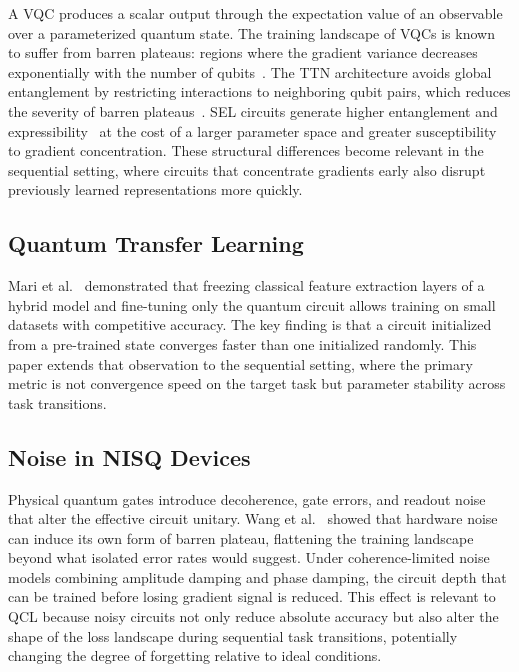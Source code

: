 \documentclass[10pt,conference]{IEEEtran}
\begin{document}
A VQC produces a scalar output through the expectation value of an
observable over a parameterized quantum state. The training landscape
of VQCs is known to suffer from barren plateaus: regions where the
gradient variance decreases exponentially with the number of
qubits~\cite{mcclean2018barren,cerezo2021cost}. The TTN architecture
avoids global entanglement by restricting interactions to neighboring
qubit pairs, which reduces the severity of barren
plateaus~\cite{pesah2021absence}. SEL circuits generate higher
entanglement and expressibility~\cite{sim2019expressibility} at the
cost of a larger parameter space and greater susceptibility to gradient
concentration. These structural differences become relevant in the
sequential setting, where circuits that concentrate gradients early
also disrupt previously learned representations more quickly.

\subsection{Quantum Transfer Learning}

Mari et al.~\cite{mari2020transfer} demonstrated that freezing
classical feature extraction layers of a hybrid model and fine-tuning
only the quantum circuit allows training on small datasets with
competitive accuracy. The key finding is that a circuit initialized
from a pre-trained state converges faster than one initialized randomly.
This paper extends that observation to the sequential setting, where
the primary metric is not convergence speed on the target task but
parameter stability across task transitions.

\subsection{Noise in NISQ Devices}

Physical quantum gates introduce decoherence, gate errors, and readout
noise that alter the effective circuit unitary. Wang et
al.~\cite{wang2024quantum} showed that hardware noise can induce its
own form of barren plateau, flattening the training landscape beyond
what isolated error rates would suggest. Under coherence-limited noise
models combining amplitude damping and phase damping, the circuit depth
that can be trained before losing gradient signal is reduced. This effect is relevant to QCL because noisy circuits not
only reduce absolute accuracy but also alter the shape of the loss
landscape during sequential task transitions, potentially changing the
degree of forgetting relative to ideal conditions.
\end{document}
